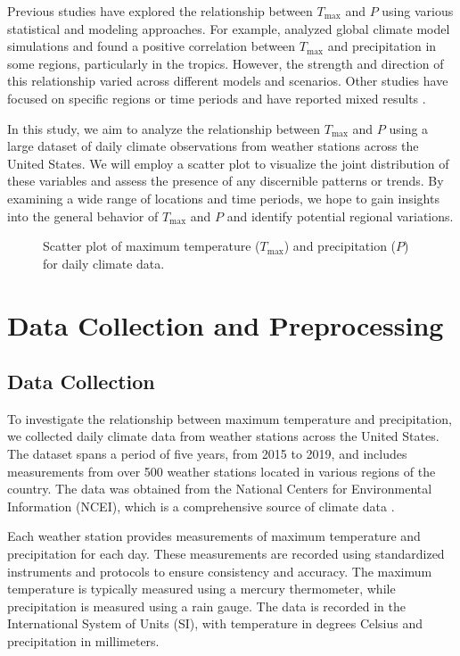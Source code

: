 \documentclass{article}
\begin{document}
Previous studies have explored the relationship between $T_{\text{max}}$ and $P$ using various statistical and modeling approaches. For example, \cite{Dai2006} analyzed global climate model simulations and found a positive correlation between $T_{\text{max}}$ and precipitation in some regions, particularly in the tropics. However, the strength and direction of this relationship varied across different models and scenarios. Other studies have focused on specific regions or time periods and have reported mixed results \cite{Karl1991, Easterling2000, Lobell2007}.

In this study, we aim to analyze the relationship between $T_{\text{max}}$ and $P$ using a large dataset of daily climate observations from weather stations across the United States. We will employ a scatter plot to visualize the joint distribution of these variables and assess the presence of any discernible patterns or trends. By examining a wide range of locations and time periods, we hope to gain insights into the general behavior of $T_{\text{max}}$ and $P$ and identify potential regional variations.

\begin{figure}[htb]
  \centering
  \caption{Scatter plot of maximum temperature ($T_{\text{max}}$) and precipitation ($P$) for daily climate data.}
  \label{fig:scatter_plot}
\end{figure}
\section{Data Collection and Preprocessing}

\subsection{Data Collection}
To investigate the relationship between maximum temperature and precipitation, we collected daily climate data from weather stations across the United States. The dataset spans a period of five years, from 2015 to 2019, and includes measurements from over 500 weather stations located in various regions of the country. The data was obtained from the National Centers for Environmental Information (NCEI), which is a comprehensive source of climate data \cite{ncei}.

Each weather station provides measurements of maximum temperature and precipitation for each day. These measurements are recorded using standardized instruments and protocols to ensure consistency and accuracy. The maximum temperature is typically measured using a mercury thermometer, while precipitation is measured using a rain gauge. The data is recorded in the International System of Units (SI), with temperature in degrees Celsius and precipitation in millimeters.
\end{document}
